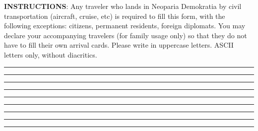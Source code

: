 




\begin{minipage}{\textwidth}
	\small
	\textbf{INSTRUCTIONS}:
	\inlinelistitem Any traveler who lands in Neoparia Demokratia by civil transportation (aircraft, cruise, etc) is required to fill this form, with the following exceptions: citizens, permanent residents, foreign diplomats.
    \inlinelistitem You may declare your accompanying travelers (for family usage only) so that they do not have to fill their own arrival cards.
    \inlinelistitem Please write in uppercase letters. ASCII letters only, without diacritics.
\end{minipage}
\vskip 20pt


\formbrickcontentheight=40pt


\par\hrule
\formbrickVlineLeft%
\formbrickVlineRight%
\par\hrule
\formbrickVlineLeft%
\formbrickVlineRight%
\par\hrule
\formbrickVlineLeft%
\formbrickVlineMid%
\formbrickVlineRight%
\par\hrule
\formbrickVlineLeft%
\formbrickVlineMid%
\formbrickVlineMid%
\formbrickVlineRight%
\par\hrule
\formbrickVlineLeft%
\formbrickVlineMid%
\formbrickVlineRight%
\par\hrule
\formbrickVlineLeft%
\formbrickVlineRight%
\par\hrule
\formbrickVlineLeft%
\formbrickVlineRight%
\par\hrule
\formbrickVlineLeft%
\formbrickVlineRight%
\par\hrule




